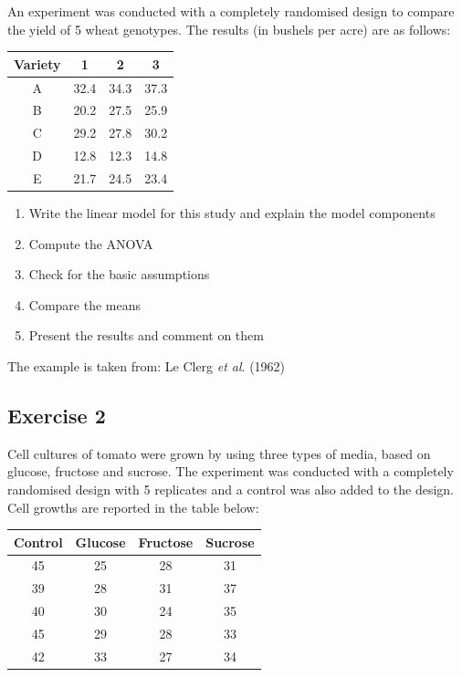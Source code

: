 \documentclass[a4paper,12pt,oneside]{book}
\providecommand{\tightlist}{%
  \setlength{\itemsep}{0pt}\setlength{\parskip}{0pt}}
\begin{document}
An experiment was conducted with a completely randomised design to compare the yield of 5 wheat genotypes. The results (in bushels per acre) are as follows:

\begin{longtable}[]{@{}cccc@{}}
\toprule
Variety & 1 & 2 & 3 \\
\midrule
\endhead
A & 32.4 & 34.3 & 37.3 \\
B & 20.2 & 27.5 & 25.9 \\
C & 29.2 & 27.8 & 30.2 \\
D & 12.8 & 12.3 & 14.8 \\
E & 21.7 & 24.5 & 23.4 \\
\bottomrule
\end{longtable}

\begin{enumerate}
\def\labelenumi{\arabic{enumi}.}
\tightlist
\item
  Write the linear model for this study and explain the model components
\item
  Compute the ANOVA
\item
  Check for the basic assumptions
\item
  Compare the means
\item
  Present the results and comment on them
\end{enumerate}

The example is taken from: Le Clerg \emph{et al}. (1962)

\hypertarget{exercise-2-4}{%
\subsection{Exercise 2}\label{exercise-2-4}}

Cell cultures of tomato were grown by using three types of media, based on glucose, fructose and sucrose. The experiment was conducted with a completely randomised design with 5 replicates and a control was also added to the design. Cell growths are reported in the table below:

\begin{longtable}[]{@{}cccc@{}}
\toprule
Control & Glucose & Fructose & Sucrose \\
\midrule
\endhead
45 & 25 & 28 & 31 \\
39 & 28 & 31 & 37 \\
40 & 30 & 24 & 35 \\
45 & 29 & 28 & 33 \\
42 & 33 & 27 & 34 \\
\bottomrule
\end{longtable}
\end{document}

